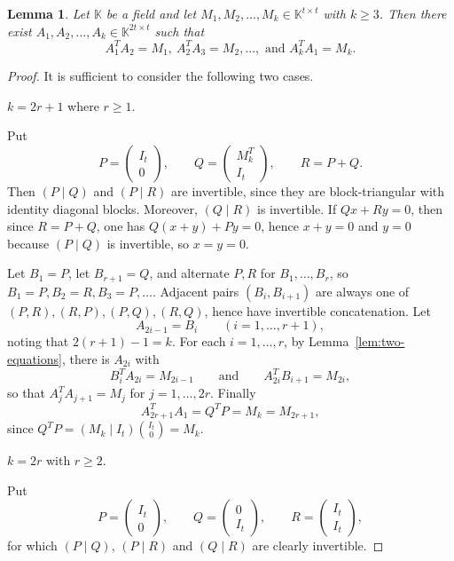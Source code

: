 \documentclass[11pt]{article}
\newtheorem{lemma}[theorem]{Lemma}
\theoremstyle{remark}
\newcommand{\K}{\mathbb{K}}
\begin{document}
 
\begin{lemma}\label{lem:mat}
    Let $\K$ be a field and let $M_1,M_2,...,M_k\in \K^{t\times t}$ with $k\ge 3$. Then there exist  $A_1, A_2,...,A_k\in \K^{2t\times t}$ such that 
    $$
    A_1^TA_2=M_1,~ A_2^TA_3=M_2,...,\text{ and } A_k^TA_1=M_k.
    $$
\end{lemma}

\begin{proof}

It is sufficient to consider the following two cases. 
\medskip

 $k=2r+1$ where $r\ge1$.  

Put
\[
  P=\begin{pmatrix}I_t\\0\end{pmatrix},
  \qquad
  Q=\begin{pmatrix}M_k^T\\I_t\end{pmatrix},
  \qquad
  R=P+Q.
\]
Then $(P\mid Q)$ and $(P\mid R)$  are   invertible, since they are block-triangular with identity diagonal blocks. Moreover,   $(Q\mid R)$ is invertible. If $Qx+Ry=0$, then  since $R=P+Q$, one has
$Q(x+y)+Py=0$, hence $x+y=0$ and $y=0$ because $(P\mid Q)$ is invertible, so $x=y=0$.

Let $B_1=P$, let $B_{r+1}=Q$, and alternate $P,R$ for $B_1,
\ldots,B_r$, so $B_1=P,B_2=R,B_3=P,\ldots$.
Adjacent pairs $(B_i,B_{i+1})$ are always one of
$(P,R),(R,P),(P,Q),(R,Q)$, hence have invertible concatenation.
Let 
\[
  A_{2i-1}=B_i\qquad (i=1,\ldots,r+1),
\]
noting that $2(r+1)-1=k$.
For each $i=1,\ldots,r$, by Lemma~\ref{lem:two-equations}, there is  $A_{2i}$ with
\[
  B_i^T A_{2i}=M_{2i-1}
  \qquad\text{and}\qquad
  A_{2i}^T B_{i+1}=M_{2i},
\]
so that $A_j^T A_{j+1}=M_j$ for $j=1,\ldots,2r$.
Finally
\[
  A_{2r+1}^T A_1=Q^TP=M_k=M_{2r+1},
\]
since $Q^TP=(M_k\mid I_t)\binom{I_t}{0}=M_k$.


\medskip

 $k=2r$ with $r\ge2$.

Put
\[
  P=\begin{pmatrix}I_t\\0\end{pmatrix},
  \qquad
  Q=\begin{pmatrix}0\\I_t\end{pmatrix},
  \qquad
  R=\begin{pmatrix}I_t\\I_t\end{pmatrix},
\]
for which $(P\mid Q)$, $(P\mid R)$ and $(Q\mid R)$ are clearly invertible.



\end{proof}
\end{document}
